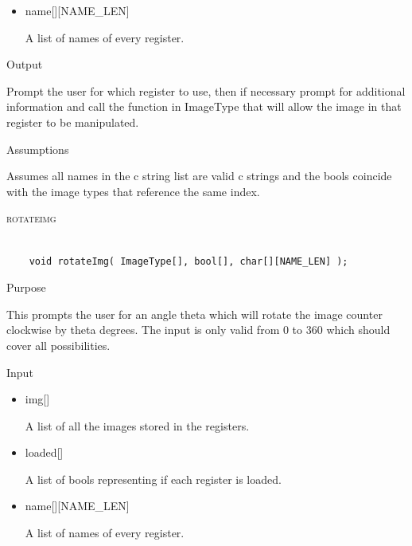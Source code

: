 \documentclass[pdftex, 11pt]{article}
\begin{document}
\begin{description}
\begin{description}
\begin{itemize}
					\item{name[][NAME\_LEN]}

						A list of names of every register.

				\end{itemize}

			\item{Output}

				Prompt the user for which register to use, then if necessary
				prompt for additional information and call the function
				in ImageType that will allow the image in that register to
				be manipulated.

			\item{Assumptions}

				Assumes all names in the c string list are valid c
				strings and the bools coincide with the image types that
				reference the same index.

		\end{description}



	\item{\textsc{rotateimg}}

		\begin{lstlisting}

	void rotateImg( ImageType[], bool[], char[][NAME_LEN] );
		\end{lstlisting}

		\begin{description}
			\item{Purpose}

				This prompts the user for an angle theta which will rotate the image counter 
				clockwise by theta degrees.  The input is only valid from 0 to 360 which
				should cover all possibilities.

			\item{Input}

				\begin{itemize}

					\item{img[]}

						A list of all the images stored in the registers.

					\item{loaded[]}

						A list of bools representing if each register is loaded.

					\item{name[][NAME\_LEN]}

						A list of names of every register.


\end{itemize}
\end{description}
\end{description}
\end{document}
